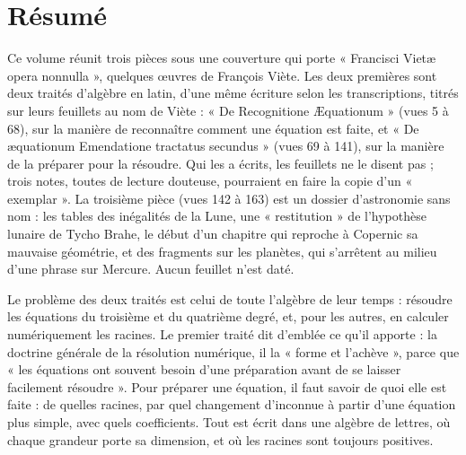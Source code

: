 \documentclass[11pt,a4paper]{article}
\begin{document}
\section*{Résumé}

\begin{resume}
Ce volume réunit trois pièces sous une couverture qui porte « Francisci Vietæ
opera nonnulla », quelques œuvres de François Viète. Les deux premières sont
deux traités d'algèbre en latin, d'une même écriture selon les transcriptions, titrés sur leurs
feuillets au nom de Viète : « De Recognitione Æquationum » (vues 5 à 68), sur la
manière de reconnaître comment une équation est faite, et « De æquationum
Emendatione tractatus secundus » (vues 69 à 141), sur la manière de la préparer
pour la résoudre. Qui les a écrits, les feuillets ne le disent pas ; trois
notes, toutes de lecture douteuse, pourraient en faire la copie d'un
« exemplar ». La troisième pièce (vues 142 à 163) est un dossier d'astronomie
sans nom : les tables des inégalités de la Lune, une « restitution » de
l'hypothèse lunaire de Tycho Brahe, le début d'un chapitre qui reproche à
Copernic sa mauvaise géométrie, et des fragments sur les planètes, qui
s'arrêtent au milieu d'une phrase sur Mercure. Aucun feuillet n'est daté.

Le problème des deux traités est celui de toute l'algèbre de leur temps :
résoudre les équations du troisième et du quatrième degré, et, pour les
autres, en calculer numériquement les racines. Le premier traité dit
d'emblée ce qu'il apporte : la doctrine générale de la résolution numérique,
il la « forme et l'achève », parce que « les équations ont souvent besoin
d'une préparation avant de se laisser facilement résoudre ». Pour préparer une
équation, il faut savoir de quoi elle est faite : de quelles racines, par quel
changement d'inconnue à partir d'une équation plus simple, avec quels
coefficients. Tout est écrit dans une algèbre de lettres, où chaque grandeur
porte sa dimension, et où les racines sont toujours positives.


\end{resume}
\end{document}
